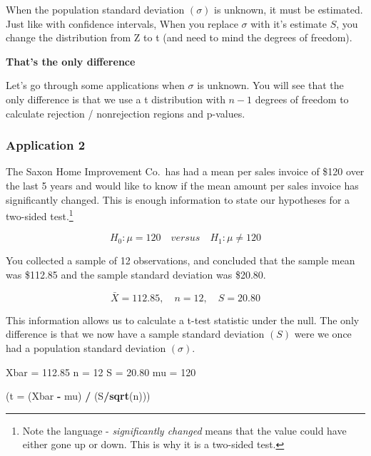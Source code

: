 \documentclass[
]{book}
\newenvironment{Shaded}{\begin{snugshade}}{\end{snugshade}}
\newcommand{\AttributeTok}[1]{\textcolor[rgb]{0.13,0.29,0.53}{#1}}
\newcommand{\DecValTok}[1]{\textcolor[rgb]{0.00,0.00,0.81}{#1}}
\newcommand{\FloatTok}[1]{\textcolor[rgb]{0.00,0.00,0.81}{#1}}
\newcommand{\FunctionTok}[1]{\textcolor[rgb]{0.13,0.29,0.53}{\textbf{#1}}}
\newcommand{\NormalTok}[1]{#1}
\newcommand{\OtherTok}[1]{\textcolor[rgb]{0.56,0.35,0.01}{#1}}
\newcommand{\SpecialCharTok}[1]{\textcolor[rgb]{0.81,0.36,0.00}{\textbf{#1}}}
\begin{document}
When the population standard deviation \((\sigma)\) is unknown, it must be estimated. Just like with confidence intervals, When you replace \(\sigma\) with it's estimate \(S\), you change the distribution from Z to t (and need to mind the degrees of freedom).

\textbf{That's the only difference}

Let's go through some applications when \(\sigma\) is unknown. You will see that the only difference is that we use a t distribution with \(n-1\) degrees of freedom to calculate rejection / nonrejection regions and p-values.

\subsubsection*{Application 2}\label{application-2-1}

The Saxon Home Improvement Co.~has had a mean per sales invoice of \$120 over the last 5 years and would like to know if the mean amount per sales invoice has significantly changed. This is enough information to state our hypotheses for a two-sided test.\footnote{Note the language - \emph{significantly changed} means that the value could have either gone up or down. This is why it is a two-sided test.}

\[H_0:\mu=120 \quad versus \quad H_1:\mu \neq 120\]

You collected a sample of 12 observations, and concluded that the sample mean was \$112.85 and the sample standard deviation was \$20.80.

\[\bar{X}=112.85, \quad n=12, \quad S=20.80\]

This information allows us to calculate a t-test statistic under the null. The only difference is that we now have a sample standard deviation \((S)\) were we once had a population standard deviation \((\sigma)\).

\begin{Shaded}
\begin{Highlighting}[]
\NormalTok{Xbar }\OtherTok{=} \FloatTok{112.85}
\NormalTok{n }\OtherTok{=} \DecValTok{12}
\NormalTok{S }\OtherTok{=} \FloatTok{20.80}
\NormalTok{mu }\OtherTok{=} \DecValTok{120}

\NormalTok{(}\AttributeTok{t =}\NormalTok{ (Xbar }\SpecialCharTok{{-}}\NormalTok{ mu) }\SpecialCharTok{/}\NormalTok{ (S}\SpecialCharTok{/}\FunctionTok{sqrt}\NormalTok{(n)))}
\end{Highlighting}
\end{Shaded}
\end{document}

